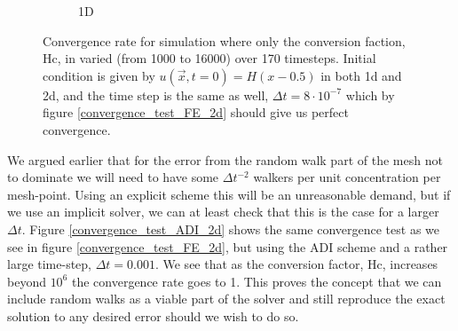 \begin{figure}[H]
\begin{subfigure}[b]{0.48\textwidth}
  \caption{1D}
  \label{Convergence_rate_diffusion_with_walk:1d}
 \end{subfigure}
 \caption[Convergence test for combined simulation]{Convergence rate for simulation where only the conversion faction, Hc, in varied (from 1000 to 16000) over 170 timesteps. Initial condition is given by $u(\vec{x},t=0) = H(x-0.5)$ in both 1d and 2d, and the time step is the same as well, $\Delta t = 8\cdot10^{-7}$ which by figure \ref{convergence_test_FE_2d} should give us perfect convergence.}
 \label{Convergence_rate_diffusion_with_walk}
\end{figure}
We argued earlier that for the error from the random walk part of the mesh not to dominate we will need to have some $\Delta t^{-2}$ walkers per unit concentration per mesh-point. Using an explicit scheme this will be an unreasonable demand, but if we use an implicit solver, we can at least check that this is the case for a larger $\Delta t$. Figure \ref{convergence_test_ADI_2d} shows the same convergence test as we see in figure \ref{convergence_test_FE_2d}, but using the ADI scheme and a rather large time-step, $\Delta t=0.001$. We see that as the conversion factor, Hc, increases beyond $10^6$ the convergence rate goes to 1. This proves the concept that we can include random walks as a viable part of the solver and still reproduce the exact solution to any desired error should we wish to do so.
